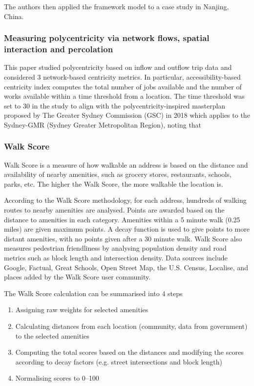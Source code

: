 The authors then applied the framework model to a case study in Nanjing, China.

\subsubsection{Measuring polycentricity via network flows, spatial interaction and percolation \texorpdfstring{\cite{sarkar_measuring_2020}}{}} \label{sarkar_measuring_2020}

This paper studied polycentricity based on inflow and outflow trip data and considered 3 network-based centricity metrics. In particular, accessibility-based centricity index computes the total number of jobs available and the number of works available within a time threshold from a location. The time threshold was set to 30 in the study to align with the polycentricity-inspired masterplan proposed by The Greater Sydney Commission (GSC) in 2018 which applies to the Sydney-GMR (Sydney Greater Metropolitan Region), noting that 

\subsubsection{Walk Score \texorpdfstring{\cite{walkscore}}{}} \label{walkscore}

Walk Score is a measure of how walkable an address is based on the distance and availability of nearby amenities, such as grocery stores, restaurants, schools, parks, etc. The higher the Walk Score, the more walkable the location is.

According to the Walk Score methodology, for each address, hundreds of walking routes to nearby amenities are analysed. Points are awarded based on the distance to amenities in each category. Amenities within a 5 minute walk (0.25 miles) are given maximum points. A decay function is used to give points to more distant amenities, with no points given after a 30 minute walk. Walk Score also measures pedestrian friendliness by analysing population density and road metrics such as block length and intersection density. Data sources include Google, Factual, Great Schools, Open Street Map, the U.S. Census, Localise, and places added by the Walk Score user community.

The Walk Score calculation can be summarised into 4 steps

\begin{enumerate}
    \item Assigning raw weights for selected amenities
    \item Calculating distances from each location (community, data from government) to the selected amenities
    \item Computing the total scores based on the distances and modifying the scores according to decay factors (e.g. street intersections and block length)
    \item Normalising scores to 0–100
\end{enumerate}

